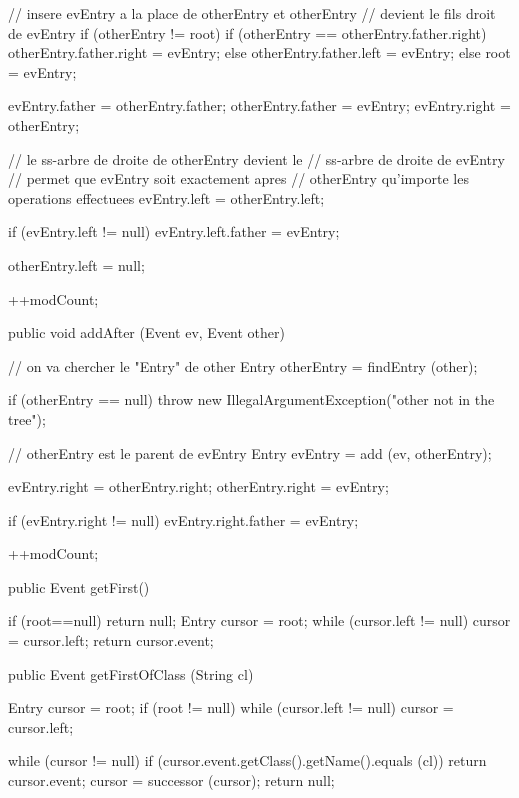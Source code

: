 \begin{hide}
\begin{code}
\begin{hide}
{      // insere evEntry a la place de otherEntry et otherEntry
      // devient le fils droit de evEntry
      if (otherEntry != root) {
         if (otherEntry == otherEntry.father.right)
            otherEntry.father.right = evEntry;
         else
            otherEntry.father.left = evEntry;
      }
      else
         root = evEntry;

      evEntry.father = otherEntry.father;
      otherEntry.father   = evEntry;
      evEntry.right   = otherEntry;

      // le ss-arbre de droite de otherEntry devient le
      // ss-arbre de droite de evEntry
      // permet que evEntry soit exactement apres
      // otherEntry qu'importe les operations effectuees
      evEntry.left  = otherEntry.left;

      if (evEntry.left != null)
         evEntry.left.father  = evEntry;

      otherEntry.left = null;

      ++modCount;
   }\end{hide}

   public void addAfter (Event ev, Event other)\begin{hide} {
      // on va chercher le "Entry" de other
      Entry otherEntry = findEntry (other);

      if (otherEntry == null)
         throw new IllegalArgumentException("other not in the tree");

      // otherEntry est le parent de evEntry
      Entry evEntry = add (ev, otherEntry);

      evEntry.right = otherEntry.right;
      otherEntry.right = evEntry;

      if (evEntry.right != null)
         evEntry.right.father = evEntry;

      ++modCount;
   }\end{hide}

   public Event getFirst()\begin{hide} {
      if (root==null)
         return null;
      Entry cursor = root;
      while (cursor.left != null)
         cursor = cursor.left;
      return cursor.event;
   }\end{hide}

   public Event getFirstOfClass (String cl)\begin{hide} {
      Entry cursor = root;
      if (root != null)
         while (cursor.left != null)
            cursor = cursor.left;

      while (cursor != null) {
         if (cursor.event.getClass().getName().equals (cl))
            return cursor.event;
         cursor = successor (cursor);
      }
      return null;
   }


\end{hide}
\end{code}
\end{hide}
